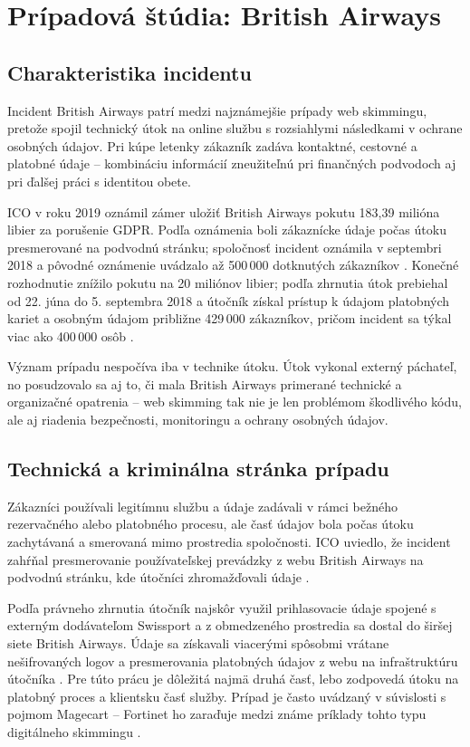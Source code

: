 \section{Prípadová štúdia: British Airways}

\subsection{Charakteristika incidentu}

Incident British Airways patrí medzi najznámejšie prípady web skimmingu, pretože spojil technický útok na online službu s rozsiahlymi následkami v ochrane osobných údajov. Pri kúpe letenky zákazník zadáva kontaktné, cestovné a platobné údaje -- kombináciu informácií zneužiteľnú pri finančných podvodoch aj pri ďalšej práci s identitou obete.

ICO v roku 2019 oznámil zámer uložiť British Airways pokutu 183,39 milióna libier za porušenie GDPR. Podľa oznámenia boli zákaznícke údaje počas útoku presmerované na podvodnú stránku; spoločnosť incident oznámila v septembri 2018 a pôvodné oznámenie uvádzalo až 500\,000 dotknutých zákazníkov \cite{edpb2019BritishAirways}. Konečné rozhodnutie znížilo pokutu na 20 miliónov libier; podľa zhrnutia útok prebiehal od 22. júna do 5. septembra 2018 a útočník získal prístup k údajom platobných kariet a osobným údajom približne 429\,000 zákazníkov, pričom incident sa týkal viac ako 400\,000 osôb \cite{gdprRegister2020BritishAirways,simmons2020BritishAirwaysPenalty}.

Význam prípadu nespočíva iba v technike útoku. Útok vykonal externý páchateľ, no posudzovalo sa aj to, či mala British Airways primerané technické a organizačné opatrenia -- web skimming tak nie je len problémom škodlivého kódu, ale aj riadenia bezpečnosti, monitoringu a ochrany osobných údajov.

\subsection{Technická a kriminálna stránka prípadu}

Zákazníci používali legitímnu službu a údaje zadávali v rámci bežného rezervačného alebo platobného procesu, ale časť údajov bola počas útoku zachytávaná a smerovaná mimo prostredia spoločnosti. ICO uviedlo, že incident zahŕňal presmerovanie používateľskej prevádzky z webu British Airways na podvodnú stránku, kde útočníci zhromažďovali údaje \cite{edpb2019BritishAirways}.

Podľa právneho zhrnutia útočník najskôr využil prihlasovacie údaje spojené s externým dodávateľom Swissport a z obmedzeného prostredia sa dostal do širšej siete British Airways. Údaje sa získavali viacerými spôsobmi vrátane nešifrovaných logov a presmerovania platobných údajov z webu na infraštruktúru útočníka \cite{simmons2020BritishAirwaysPenalty}. Pre túto prácu je dôležitá najmä druhá časť, lebo zodpovedá útoku na platobný proces a klientsku časť služby. Prípad je často uvádzaný v súvislosti s pojmom Magecart -- Fortinet ho zaraďuje medzi známe príklady tohto typu digitálneho skimmingu \cite{fortinet2019MagecartSkimmer}.

